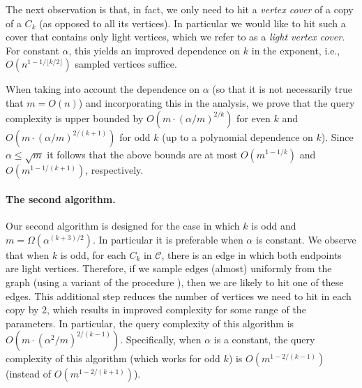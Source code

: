 \documentclass{article}
\newcommand{\calC}{{\mathcal{C}}}
\newcommand{\commentt}[1]{ {}}
\newcommand{\reut}[1]{ {}}
\newcommand{\SodaReb}[1]{{ #1}}
\newcommand{\SelectEdge}{\hyperref[alg:select-edge]{\color{black}{\sf Select-an-Edge}}}
\begin{document}
The next observation is that, in fact, we only need to hit a \emph{vertex cover} of a copy of a $C_k$ (as opposed to all its vertices). In particular we would like to hit such a cover that contains only light vertices, which we refer to as a \emph{light vertex cover}. 
For constant $\alpha$, this yields an improved dependence on $k$ in the exponent, i.e., $O(n^{1-1/\lfloor k/2\rfloor})$ sampled vertices suffice.
%

When taking into account the dependence on $\alpha$ (so that it is not necessarily true that $m=O(n)$) and incorporating this in the analysis, we prove that the query complexity is upper bounded by $O(m \cdot (\alpha/m)^{2/k})$ for even $k$ and $O(m \cdot (\alpha/m)^{2/(k+1)})$ for odd $k$ 
(up to a polynomial dependence on $k$).
Since $\alpha \leq \sqrt{m}$ it follows that the above bounds are at most $O(m^{1-1/k})$ and $O(m^{1-1/(k+1)})$, respectively. 

\paragraph{The second algorithm.}
Our second algorithm is designed for the case in which $k$ is odd and $m = \Omega(\alpha^{(k+3)/2})$. In particular it is preferable when $\alpha$ is constant. 
We observe that when $k$ is odd, for each $C_k$ in $\calC$, there is an edge in 
 which both endpoints are light vertices.
 \SodaReb{Therefore, if we sample edges (almost) uniformly from the graph (using a variant of the procedure \SelectEdge), then} we are likely to hit one of these edges. This additional step reduces the number of vertices we need to hit in each copy by $2$, which  results in improved complexity for some range of the parameters. In particular, the query complexity of this algorithm is $O(m \cdot (\alpha^2/m)^{2/(k-1)})$.
 Specifically, when $\alpha$ is a constant, the query complexity of this algorithm (which works for odd $k$) is $O(m^{1-2/(k-1)})$ (instead of $O(m^{1-2/(k+1)})$).
\end{document}
